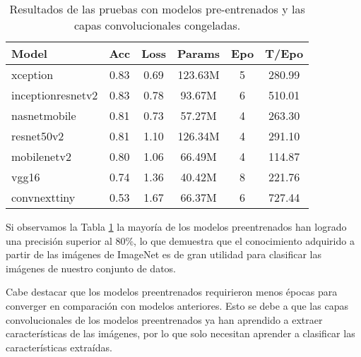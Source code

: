\documentclass[10pt,a4paper,twocolumn,twoside]{article}
\begin{document}
\begin{table}[h]
  \centering
  \label{table:pretrained_models}
  \begin{tabular}{@{}lccccc@{}}
    \toprule
    \textbf{Model}                      & \textbf{Acc} & \textbf{Loss} & \textbf{Params} & \textbf{Epo} & \textbf{T/Epo} \\
    \midrule
    xception\cite{chollet2017xception}                            & 0.83              & 0.69          & 123.63M         & 5               & 280.99              \\
    inceptionresnetv2\cite{szegedy2017inception}                   & 0.83              & 0.78          & 93.67M          & 6               & 510.01              \\
    nasnetmobile\cite{Zoph2018}                        & 0.81              & 0.73          & 57.27M          & 4               & 263.30              \\
    resnet50v2\cite{he2016identity}                          & 0.81              & 1.10          & 126.34M         & 4               & 291.10              \\
    mobilenetv2\cite{sandler2018mobilenetv2}                         & 0.80              & 1.06          & 66.49M          & 4               & 114.87              \\
    vgg16\cite{vgg16}                               & 0.74              & 1.36          & 40.42M          & 8               & 221.76              \\
    convnexttiny\cite{Liu2020conv}                        & 0.53              & 1.67          & 66.37M          & 6               & 727.44              \\
    \bottomrule
  \end{tabular}
  \caption{Resultados de las pruebas con modelos pre-entrenados y las capas convolucionales congeladas.}
  \label{table:pretrained_models}
\end{table}

Si observamos la Tabla \ref{table:pretrained_models} la mayoría de los modelos preentrenados han logrado una precisión superior al 80\%, lo que demuestra que el conocimiento adquirido a partir de las imágenes de ImageNet es de gran utilidad para clasificar las imágenes de nuestro conjunto de datos.

Cabe destacar que los modelos preentrenados requirieron menos épocas para converger en comparación con modelos anteriores. Esto se debe a que las capas convolucionales de los modelos preentrenados ya han aprendido a extraer características de las imágenes, por lo que solo necesitan aprender a clasificar las características extraídas.
\end{document}
